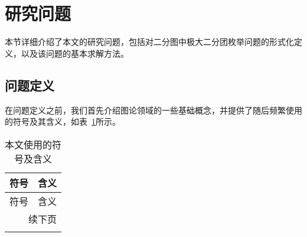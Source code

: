 \section{研究问题}
\label{sec:topic}

本节详细介绍了本文的研究问题，包括对二分图中极大二分团枚举问题的形式化定义，以及该问题的基本求解方法。

\subsection{问题定义}


在问题定义之前，我们首先介绍图论领域的一些基础概念，并提供了随后频繁使用的符号及其含义，如表~\ref{tab:definition}所示。

\begin{longtable}[htbp]{|c|p{12cm}|}
    \caption{本文使用的符号及含义}
    \label{tab:definition} \\
    
    \hline
    符号 & 含义 \\ \hline
    \endfirsthead
    
    \hline
    符号 & 含义 \\ \hline
    \endhead
    
    \hline
    \multicolumn{2}{r}{续下页} \\
    \endfoot
    
    \hline
    \endlastfoot
    

\end{longtable}
